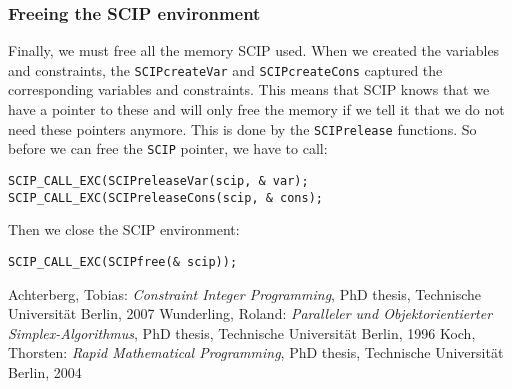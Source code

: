 \documentclass[a4paper]{article}
\begin{document}
\subsubsection{Freeing the SCIP environment}

Finally, we must free all the memory SCIP used. When we created the variables and constraints, the \verb+SCIPcreateVar+ and \verb+SCIPcreateCons+ captured the corresponding variables and constraints. This means that SCIP knows that we have a pointer to these and will only free the memory if we tell it that we do not need these pointers anymore. This is done by the \verb+SCIPrelease+ functions.  So before we can free the \verb+SCIP+ pointer, we have to call:
\begin{verbatim}
SCIP_CALL_EXC(SCIPreleaseVar(scip, & var);
SCIP_CALL_EXC(SCIPreleaseCons(scip, & cons);
\end{verbatim}
Then we close the SCIP environment:
\begin{verbatim}
SCIP_CALL_EXC(SCIPfree(& scip));
\end{verbatim}

\begin{thebibliography}{99}
 Achterberg, Tobias: \emph{Constraint Integer Programming}, PhD thesis, Technische Universit\"at Berlin, 2007
 Wunderling, Roland: \emph{Paralleler und Objektorientierter Simplex-Algorithmus}, PhD thesis, Technische Universit\"at Berlin, 1996
 Koch, Thorsten: \emph{Rapid Mathematical Programming}, PhD thesis, Technische Universit\"at Berlin, 2004
\end{thebibliography}
\end{document}
